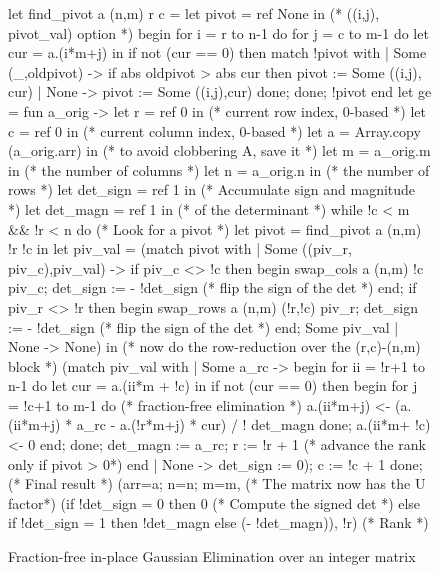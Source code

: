\documentclass{elsart}
\begin{document}
\begin{figure}
\begin{code}[numbers=left,numberblanklines=false,fontsize=\scriptsize]
let find_pivot a (n,m) r c =
  let pivot = ref None in               (* ((i,j), pivot_val) option *)
  begin
  for i = r to n-1 do
    for j = c to m-1 do
      let cur = a.(i*m+j) in
      if not (cur == 0) then
        match !pivot with
        | Some (_,oldpivot) ->
            if abs oldpivot > abs cur then
               pivot := Some ((i,j), cur)
        | None -> pivot := Some ((i,j),cur)
  done; done;
  !pivot
  end
let ge = fun a_orig ->
  let r = ref 0 in                    (* current row index, 0-based *)
  let c = ref 0 in                    (* current column index, 0-based *)
  let a = Array.copy (a_orig.arr) in  (* to avoid clobbering A, save it *)
  let m = a_orig.m in                 (* the number of columns *)
  let n = a_orig.n in                 (* the number of rows *)
  let det_sign = ref 1 in             (* Accumulate sign and magnitude *)
  let det_magn = ref 1 in             (*   of the determinant *)
  while !c < m && !r < n do
    (* Look for a pivot *)
    let pivot = find_pivot a (n,m) !r !c in
    let piv_val = (match  pivot with
    | Some ((piv_r, piv_c),piv_val) ->
        if piv_c <> !c then
          begin
            swap_cols a (n,m) !c piv_c;
            det_sign := - !det_sign (* flip the sign of the det *)
          end;
        if piv_r <> !r then
          begin
            swap_rows a (n,m) (!r,!c) piv_r;
            det_sign := - !det_sign (* flip the sign of the det *)
          end;
        Some piv_val
    | None -> None) in
    (* now do the row-reduction over the (r,c)-(n,m) block *)
    (match piv_val with
    | Some a_rc -> begin
        for ii = !r+1 to n-1 do
          let cur = a.(ii*m + !c) in
          if not (cur == 0)  then
            begin
              for j = !c+1 to m-1 do
                (* fraction-free elimination *)
                a.(ii*m+j) <- (a.(ii*m+j) * a_rc - a.(!r*m+j) * cur) / ! det_magn
              done;
              a.(ii*m+ !c) <- 0
            end;
        done;
        det_magn := a_rc;
        r := !r + 1                 (* advance the rank only if pivot > 0*)
      end
    | None -> det_sign := 0);
    c := !c + 1
    done;
    (* Final result *)
    ({arr=a; n=n; m=m},                 (* The matrix now has the U factor*)
    (if      !det_sign = 0 then  0      (* Compute the signed det *)
     else if !det_sign = 1 then  !det_magn 
     else                        (- !det_magn)),
    !r)                                 (* Rank *)
\end{code}
\caption{Fraction-free in-place Gaussian Elimination over an integer
  matrix}\label{fig:GE-algorithm}
\end{figure}
\end{document}
